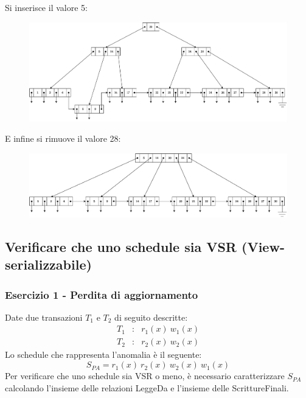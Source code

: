 \documentclass[a4paper]{article}
\begin{document}
	\noindent
	Si inserisce il valore 5:
	\begin{figure}[!htp]
		\centering
		\includegraphics[width=\textwidth]{img/b+-tree-12.pdf}
	\end{figure}
	
	\noindent
	E infine si rimuove il valore 28:
	\begin{figure}[!htp]
		\centering
		\includegraphics[width=\textwidth]{img/b+-tree-13.pdf}
	\end{figure}\newpage
	
	\subsection{Verificare che uno schedule sia VSR (View-serializzabile)}
	
	\subsubsection{Esercizio 1 - Perdita di aggiornamento}
	
	Date due transazioni $T_{1}$ e $T_{2}$ di seguito descritte:
	\begin{equation*}
		\begin{array}{lll}
			T_{1} &:& r_{1}\left(x\right) \: w_{1}\left(x\right) \\
			T_{2} &:& r_{2}\left(x\right) \: w_{2}\left(x\right)
		\end{array}
	\end{equation*}
	Lo schedule che rappresenta l'anomalia è il seguente:
	\begin{equation*}
		S_{PA} = r_{1}\left(x\right) \: r_{2}\left(x\right) \: w_{2}\left(x\right) \: w_{1}\left(x\right)
	\end{equation*}
	Per verificare che uno schedule sia VSR o meno, è necessario caratterizzare $S_{PA}$ calcolando l'insieme delle relazioni LeggeDa e l'insieme delle ScrittureFinali.\newline
	
\end{document}
